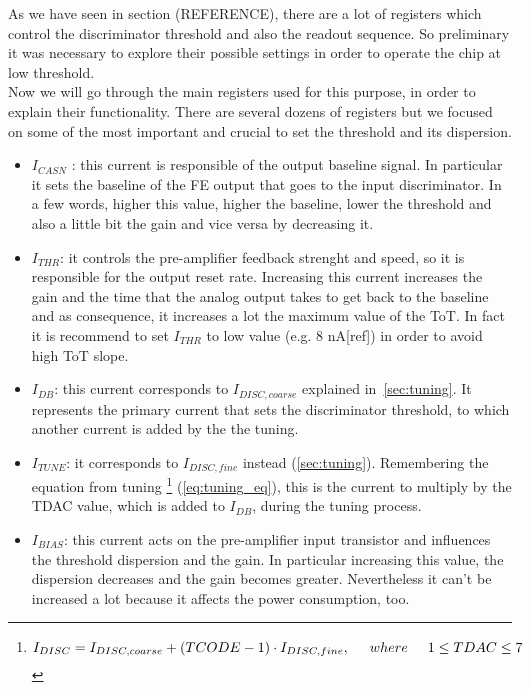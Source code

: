 As we have seen in section (REFERENCE), there are a lot of registers which control the discriminator threshold and also the readout sequence. So preliminary it was necessary to explore their possible settings in order to operate the chip at low threshold.\\

Now we will go through the main registers used for this purpose, in order to explain their functionality. There are several dozens of registers but we focused on some of the most important and crucial to set the threshold and its dispersion.

\begin{itemize}
\label{currents}
\item \textit{$I_{CASN}$} : this current is responsible of the output baseline signal. In particular it sets the baseline of the FE output that goes to the input discriminator. In a few words, higher this value, higher the baseline, lower the threshold and also a little bit the gain and vice versa by decreasing it.
\item \textit{$I_{THR}$}: it controls the pre-amplifier feedback strenght and speed, so it is responsible for the output reset rate. Increasing this current increases the gain and the time that the analog output takes to get back to the baseline and as consequence, it increases a lot the maximum value of the ToT. In fact it is recommend to set $I_{THR}$ to low value (e.g. 8 nA[ref]) in order to avoid high ToT slope.
\item \textit{$I_{DB}$}: this current corresponds to \textbf{$I_{DISC,coarse}$} explained in~\autoref{sec:tuning}. It represents the primary current that sets the discriminator threshold, to which another current is added by the the tuning.
\item \textit{$I_{TUNE}$}: it corresponds to \textbf{$I_{DISC,fine}$} instead (\autoref{sec:tuning}). Remembering the equation from tuning \footnote{
\begin{equation}
I_{DISC} = I_{DISC, coarse} + (TCODE - 1) \cdot I_{DISC,fine},  \hspace{.5cm}	where \hspace{.5cm} 1 \leq TDAC \leq 7
\end{equation}
} (\autoref{eq:tuning_eq}), this is the current to multiply by the TDAC value, which is added to $I_{DB}$, during the tuning process.
\item \textit{$I_{BIAS}$}: this current acts on the pre-amplifier input transistor and influences the threshold dispersion and the gain. In particular increasing this value, the dispersion decreases and the gain becomes greater. Nevertheless it can't be increased a lot because it affects the power consumption, too. %
\end{itemize}

